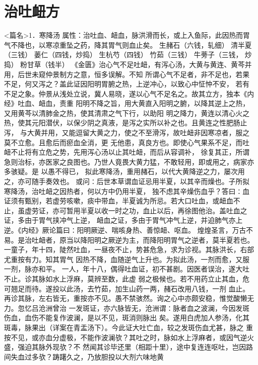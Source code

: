 \documentclass[a4paper,12pt,UTF8,twoside]{ctexbook}
\begin{document}
\chapter{治吐衄方}
<篇名>1．寒降汤
属性：治吐血、衄血，脉洪滑而长，或上入鱼际，此因热而胃气不降也，以寒凉重坠之药，降其胃气则血止矣。 
生赭石（六钱，轧细） 清半夏（三钱） 蒌仁（四钱，炒捣） 生杭芍（四钱） 竹茹（三钱） 牛蒡子（三钱， 
炒捣） 粉甘草（钱半） 
《金匮》治心气不足吐衄，有泻心汤，大黄与黄连、黄芩并用，后世未窥仲景制方之意，恒多误解。不知 
所谓心气不足者，非不足也，若果不足，何又泻之？盖此证因阳明胃腑之热，上逆冲心，以致心中怔忡不安， 
若有不足之象。仲景从浅处立说，冀人易晓，遂以心气不足名之。故其立方，独本《内经》吐血、衄血，责重 
阳明不降之旨，用大黄直入阳明之腑，以降其逆上之热，又用黄芩以清肺金之热，使其清肃之气下行，以助阳 
明之降力，黄连以清心火之热，使其元阳潜伏，以保少阴之真液，是泻之实所以补之也。且黄连之性肥肠止泻， 
与大黄并用，又能逗留大黄之力，使之不至滑泻，故吐衄非因寒凉者，服之莫不立愈。且愈后而瘀血全消，更 
无他患，真良方也。即使心气果系不足，而吐衄不止将有立危之势，先用泻心汤以止其吐衄，而后从容调补， 
徐复其正，所谓急则治标，亦医家之良图也。乃世人竟畏大黄力猛，不敢轻用，即或用之，病家亦多骇疑。是 
以愚不得已， 
拟此寒降汤，重用赭石，以代大黄降逆之力，屡次用之，亦可随手奏效也。 
或问∶后世本草谓血证忌用半夏，以其辛而燥也。子所拟寒降汤，治吐衄之因热者，何以方中仍用半夏， 
独不虑其辛燥伤血乎？答曰∶血证须有甄别，若虚劳咳嗽，痰中带血，半夏诚为所忌。若大口吐血，或衄血不 
止，虽虚劳证，亦可暂用半夏以收一时之功，血止以后，再徐图他治。盖吐血之证，多由于胃气挟冲气上逆， 
衄血之证，多由于胃气冲气上逆，并迫肺气亦上逆。《内经》厥论篇曰∶阳明厥逆、喘咳身热、善惊衄、呕血。 
煌煌圣言，万古不易。是治吐衄者，原当以降阳明之厥逆为主，而降阳明胃气之逆者，莫半夏若也。 
一童子，年十四，陡然吐血，一昼夜不止，势甚危急，求为诊视。其脉洪长，右部尤重按有力。知其胃气 
因热不降，血随逆气上升也。为拟此汤，一剂而愈，又服一剂，脉亦和平。 
一人，年十八，偶得吐血证，初不甚剧。因医者误治，遂大吐不止。诊其脉如水上浮麻，莫辨至数，此虚 
弱之极候也。若不用药立止其血，危可翘足而待。遂投以此汤，去竹茹，加生山药一两，赭石改用八钱，一剂 
血止。再诊其脉，左右皆无，重按亦不见。愚不禁骇然。询之心中亦颇安稳，惟觉酸懒无力。忽忆吕沧洲曾治 
一发斑证，亦六脉皆无，沧洲谓∶脉者血之波澜，今因发斑伤血，血伤不能复作波澜，是以不见，斑消则脉出 
矣。遂用白虎加人参汤，化其斑毒，脉果出（详案在青盂汤下）。今此证大吐亡血，较之发斑伤血尤甚，脉之 
重按不见，或亦血分虚极，不能作波澜欤？其吐之时，脉如水上浮麻者，或因气逆火盛，强迫其脉外现欤？不 
然闻其诊毕还里（相距十里），途中复连连呕吐，岂因路间失血过多欤？踌躇久之，乃放胆投以大剂六味地黄 
\end{document}
